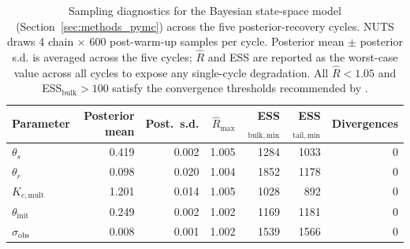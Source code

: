 \begin{table}[t]
\centering
\caption{Sampling diagnostics for the Bayesian state-space model (Section~\ref{sec:methods_pymc}) across the five posterior-recovery cycles. NUTS \citep{Hoffman2014} draws 4 chain $\times$ 600 post-warm-up samples per cycle. Posterior mean $\pm$ posterior s.d. is averaged across the five cycles; $\hat{R}$ and ESS are reported as the worst-case value across all cycles to expose any single-cycle degradation. All $\hat{R} < 1.05$ and ESS$_{\mathrm{bulk}} > 100$ satisfy the convergence thresholds recommended by \citet{Vehtari2021}.}
\label{tab:mcmc-diagnostics}
\begin{tabular}{lrrrrrr}
\toprule
Parameter & Posterior mean & Post.\ s.d. & $\hat{R}_\mathrm{max}$ & ESS$_\mathrm{bulk,min}$ & ESS$_\mathrm{tail,min}$ & Divergences \\
\midrule
$\theta_s$ & 0.419 & 0.002 & 1.005 & 1284 & 1033 & 0 \\
$\theta_r$ & 0.098 & 0.020 & 1.004 & 1852 & 1178 & 0 \\
$K_{c,\mathrm{mult}}$ & 1.201 & 0.014 & 1.005 & 1028 & 892 & 0 \\
$\theta_\mathrm{init}$ & 0.249 & 0.002 & 1.002 & 1169 & 1181 & 0 \\
$\sigma_\mathrm{obs}$ & 0.008 & 0.001 & 1.002 & 1539 & 1566 & 0 \\
\bottomrule
\end{tabular}
\end{table}